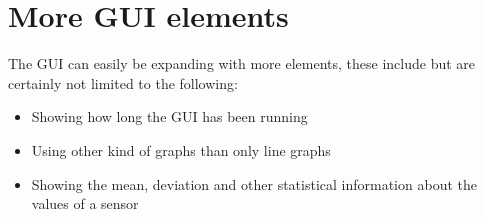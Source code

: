 \section{More GUI elements}
The GUI can easily be expanding with more elements, these include but are certainly not limited to the following:

\begin{itemize}
	\item Showing how long the GUI has been running
	\item Using other kind of graphs than only line graphs
	\item Showing the mean, deviation and other statistical information about the values of a sensor
\end{itemize}


